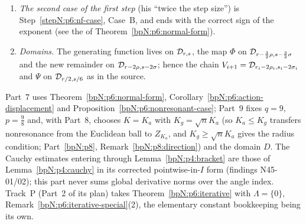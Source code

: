 \begin{remark}
\begin{enumerate}[label=(\arabic*)]
\item \emph{The second case of the first step} (his ``twice the step size'') is Step~\ref{stepN:p6:nf-case}, Case~B, and ends with the correct sign of the exponent (see the \sourcegap{} of Theorem~\ref{bpN:p6:normal-form}).
\item \emph{Domains.} The generating function lives on $\mathcal D_{r,s}$, the map $\Phi$ on $\mathcal D_{r-\frac32\rho,s-\frac32\sigma}$ and the new remainder on $\mathcal D_{r-2\rho,s-2\sigma}$; hence the chain $V_{i+1}=\mathcal D_{r_i-2\rho_i,s_i-2\sigma_i}$ and $\Psi$ on $\mathcal D_{r/2,s/6}$ as in the source.
\end{enumerate}
\end{remark}

\begin{remark}[Consumers]\label{bpN:p6:consumers}
Part~7 uses Theorem~\ref{bpN:p6:normal-form}, Corollary~\ref{bpN:p6:action-displacement} and Proposition~\ref{bpN:p6:nonresonant-case}; Part~9 fixes $q=9$, $p=\frac98$ and, with Part~8, chooses $K=K_a$ with $K_g=\sqrt nK_a$ (so $K_a\le K_g$ transfers nonresonance from the Euclidean ball to $Z_{K_a}$, and $K_g\ge\sqrt nK_a$ gives the radius condition; Part~\ref{bpN:p8}, Remark~\ref{bpN:p8:direction}) and the domain $D$. The Cauchy estimates entering through Lemma~\ref{bpN:p4:bracket} are those of Lemma~\ref{bpN:p4:cauchy} in its corrected pointwise-in-$I$ form (findings N45-01/02); this part never sums global derivative norms over the angle index. Track~P (Part~2 of its plan) takes Theorem~\ref{bpN:p6:iterative} with $\Lambda=\{0\}$, Remark~\ref{bpN:p6:iterative-special}(2), the elementary constant bookkeeping being its own.
\end{remark}
\endgroup
